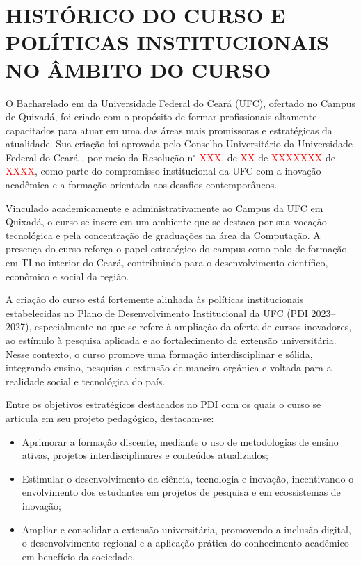 \chapter{HISTÓRICO DO CURSO E POLÍTICAS INSTITUCIONAIS NO ÂMBITO DO CURSO}
\label{cap:historico-do-curso}

O Bacharelado em \nomedocurso da Universidade Federal do Ceará (UFC), ofertado no Campus de Quixadá, foi criado com o propósito de formar profissionais altamente capacitados para atuar em uma das áreas mais promissoras e estratégicas da atualidade. Sua criação foi aprovada pelo Conselho Universitário da Universidade Federal do Ceará , por meio da Resolução n$^\circ$ \textcolor{red}{XXX}, de \textcolor{red}{XX} de \textcolor{red}{XXXXXXX} de \textcolor{red}{XXXX}, como parte do compromisso institucional da UFC com a inovação acadêmica e a formação orientada aos desafios contemporâneos.

Vinculado academicamente e administrativamente ao Campus da UFC em Quixadá, o curso se insere em um ambiente que se destaca por sua vocação tecnológica e pela concentração de graduações na área da Computação. A presença do curso reforça o papel estratégico do campus como polo de formação em TI no interior do Ceará, contribuindo para o desenvolvimento científico, econômico e social da região.

A criação do curso está fortemente alinhada às políticas institucionais estabelecidas no Plano de Desenvolvimento Institucional da UFC (PDI 2023–2027), especialmente no que se refere à ampliação da oferta de cursos inovadores, ao estímulo à pesquisa aplicada e ao fortalecimento da extensão universitária. Nesse contexto, o curso promove uma formação interdisciplinar e sólida, integrando ensino, pesquisa e extensão de maneira orgânica e voltada para a realidade social e tecnológica do país.

Entre os objetivos estratégicos destacados no PDI com os quais o curso se articula em seu projeto pedagógico, destacam-se:
\begin{itemize}
    \item {Aprimorar a formação discente}, mediante o uso de metodologias de ensino ativas, projetos interdisciplinares e conteúdos atualizados;

    \item {Estimular o desenvolvimento da ciência, tecnologia e inovação}, incentivando o envolvimento dos estudantes em projetos de pesquisa e em ecossistemas de inovação;

    \item {Ampliar e consolidar a extensão universitária}, promovendo a inclusão digital, o desenvolvimento regional e a aplicação prática do conhecimento acadêmico em benefício da sociedade.
    
\end{itemize}

